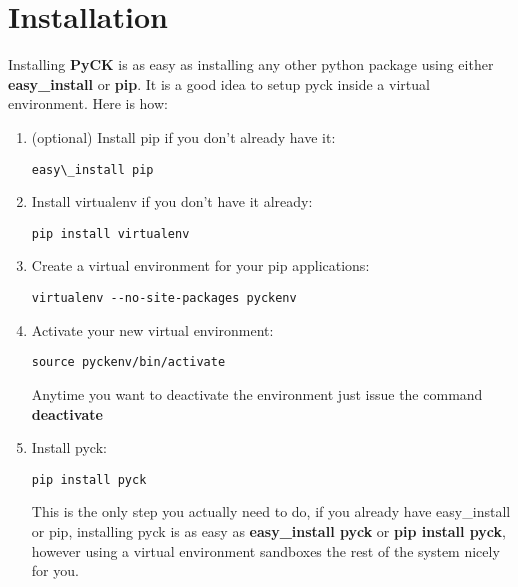 \documentclass[letterpaper,10pt,english]{sphinxmanual}
\begin{document}
\chapter{Installation}
\label{installation:installation}\label{installation::doc}\label{installation:id1}
Installing \textbf{PyCK} is as easy as installing any other python package using either \textbf{easy\_install} or \textbf{pip}. It is a good idea to setup pyck inside a virtual environment. Here is how:
\begin{enumerate}
\item {} 
(optional) Install pip if you don't already have it:

\begin{Verbatim}[commandchars=\\\{\}]
easy\_install pip
\end{Verbatim}

\item {} 
Install virtualenv if you don't have it already:

\begin{Verbatim}[commandchars=\\\{\}]
pip install virtualenv
\end{Verbatim}

\item {} 
Create a virtual environment for your pip applications:

\begin{Verbatim}[commandchars=\\\{\}]
virtualenv --no-site-packages pyckenv
\end{Verbatim}

\item {} 
Activate your new virtual environment:

\begin{Verbatim}[commandchars=\\\{\}]
source pyckenv/bin/activate
\end{Verbatim}

Anytime you want to deactivate the environment just issue the command \textbf{deactivate}

\item {} 
Install pyck:

\begin{Verbatim}[commandchars=\\\{\}]
pip install pyck
\end{Verbatim}

This is the only step you actually need to do, if you already have easy\_install or pip, installing pyck is as easy as \textbf{easy\_install pyck} or \textbf{pip install pyck}, however using a virtual environment sandboxes the rest of the system nicely for  you.

\end{enumerate}
\end{document}
